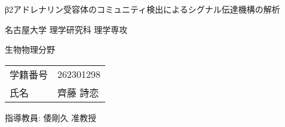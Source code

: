 \begin{titlepage}
    \fontsize{30pt}{30pt} \selectfont
    
    \centering
    β2アドレナリン受容体のコミュニティ検出によるシグナル伝達機構の解析
    \vspace{25pt}

    名古屋大学 理学研究科 理学専攻
    \vspace{15pt}

    生物物理分野
    \vspace{15pt}

    \begin{tabular}{ll}
        学籍番号 & 262301298 \\
        氏名   & 齊藤 詩恋 \\
    \end{tabular}
    \vspace{10pt}

    指導教員: 倭剛久 准教授
    \vspace{10pt}

    \normalsize

\end{titlepage}